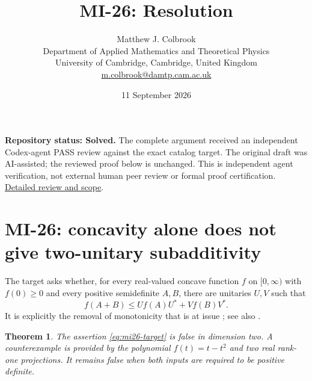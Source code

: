 \documentclass[10pt,a4paper]{article}
\title{MI-26: Resolution}
\author{Matthew J. Colbrook\\
\small Department of Applied Mathematics and Theoretical Physics\\
\small University of Cambridge, Cambridge, United Kingdom\\
\small\href{mailto:m.colbrook@damtp.cam.ac.uk}{m.colbrook@damtp.cam.ac.uk}}
\date{11 September 2026}
\newtheorem{theorem}{Theorem}[section]
\theoremstyle{remark}
\begin{document}
\maketitle
\textbf{Repository status: Solved.}
The complete argument received an independent Codex-agent PASS review
against the exact catalog target.
The original draft was AI-assisted; the reviewed proof below is unchanged.
This is independent agent verification, not external human peer review or
formal proof certification. \href{https://github.com/ajt60gaibb/OpenProblemsInNLA/blob/main/references/colbrook-matrix-2026-09-11/verification/reviews/MI-26-review.md}{Detailed review and scope}.
\par\medskip
\section{MI-26: concavity alone does not give two-unitary subadditivity}
\label{sec:mi26}

The target asks whether, for every real-valued concave function $f$ on $[0,\infty)$ with $f(0)\geq0$ and every positive semidefinite $A,B$, there are unitaries $U,V$ such that
\begin{equation}\label{eq:mi26-target}
 f(A+B)\leq Uf(A)U^*+Vf(B)V^*.
\end{equation}
It is explicitly the removal of monotonicity that is at issue \cite[Problem 5]{AK2012}; see also \cite[Remark 3.13]{BL2011}.

\begin{theorem}\label{thm:mi26}
The assertion \eqref{eq:mi26-target} is false in dimension two. A counterexample is provided by the polynomial $f(t)=t-t^2$ and two real rank-one projections. It remains false when both inputs are required to be positive definite.
\end{theorem}
\end{document}
